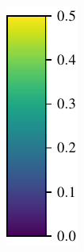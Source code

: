 \begin{figure}[tpbh!]
\begin{center}
\begin{subfigure}[b]{0.07\textwidth}
			\includegraphics[width=\linewidth]{figs/run10_init_fail/colorbar.pdf}

\end{subfigure}
\end{center}
\end{figure}
